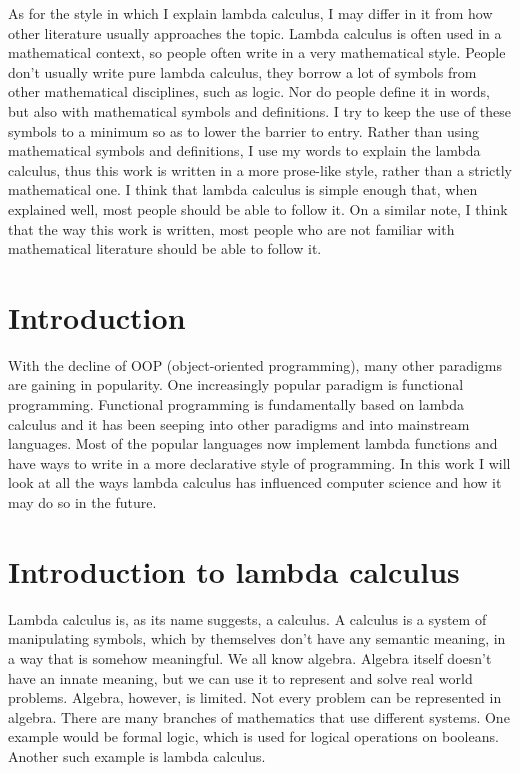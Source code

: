 \documentclass[11pt]{article}
\begin{document}
As for the style in which I explain lambda calculus, I may differ in it from
how other literature usually approaches the topic. Lambda calculus is often
used in a mathematical context, so people often write in a very mathematical
style. People don't usually write pure lambda calculus, they borrow a lot of
symbols from other mathematical disciplines, such as logic. Nor do people
define it in words, but also with mathematical symbols and definitions. I try
to keep the use of these symbols to a minimum so as to lower the barrier to
entry. Rather than using mathematical symbols and definitions, I use my words
to explain the lambda calculus, thus this work is written in a more prose-like
style, rather than a strictly mathematical one. I think that lambda calculus is
simple enough that, when explained well, most people should be able to follow
it. On a similar note, I think that the way this work is written, most people
who are not familiar with mathematical literature should be able to follow it.

\newpage

\tableofcontents
\newpage

\section{Introduction}

With the decline of OOP (object-oriented programming), many other paradigms are
gaining in popularity. One increasingly popular paradigm is functional
programming. Functional programming is fundamentally based on lambda calculus
and it has been seeping into other paradigms and into mainstream languages.
Most of the popular languages now implement lambda functions and have ways to
write in a more declarative style of programming. In this work I will look at
all the ways lambda calculus has influenced computer science and how it may do
so in the future.

\section{Introduction to lambda calculus}

Lambda calculus is, as its name suggests, a calculus. A calculus is a system of
manipulating symbols, which by themselves don't have any semantic meaning, in a
way that is somehow meaningful. We all know algebra. Algebra itself doesn't
have an innate meaning, but we can use it to represent and solve real world
problems. Algebra, however, is limited. Not every problem can be represented in
algebra. There are many branches of mathematics that use different systems.
One example would be formal logic, which is used for logical operations on
booleans. Another such example is lambda calculus.
\end{document}
